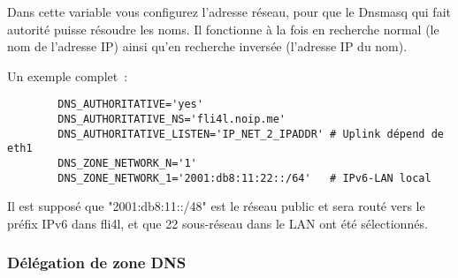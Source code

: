 \begin{description}
	  Dans cette variable vous configurez l'adresse réseau, pour que le Dnsmasq qui fait
	  autorité puisse résoudre les noms. Il fonctionne à la fois en recherche normal
	  (le nom de l'adresse IP) ainsi qu'en recherche inversée (l'adresse IP du nom).

	  Un exemple complet~:

\begin{example}
\begin{verbatim}
        DNS_AUTHORITATIVE='yes'
        DNS_AUTHORITATIVE_NS='fli4l.noip.me'
        DNS_AUTHORITATIVE_LISTEN='IP_NET_2_IPADDR' # Uplink dépend de eth1
        DNS_ZONE_NETWORK_N='1'
        DNS_ZONE_NETWORK_1='2001:db8:11:22::/64'   # IPv6-LAN local
\end{verbatim}
\end{example}

	  Il est supposé que "2001:db8:11::/48" est le réseau public et sera routé vers le préfix IPv6
	  dans fli4l, et que 22 sous-réseau dans le LAN ont été sélectionnés.

\end{description}

\subsubsection{Délégation de zone DNS}

